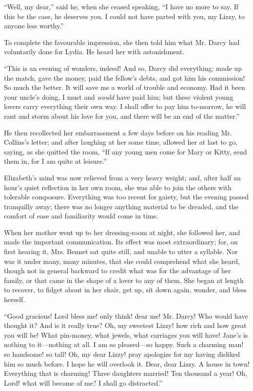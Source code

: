 \documentclass[12pt,openright]{book}
\begin{document}
“Well, my dear,” said he, when she ceased speaking, “I have no more to say. If this be the case, he deserves you. I could not have parted with you, my Lizzy, to anyone less worthy.”

To complete the favourable impression, she then told him what Mr. Darcy had voluntarily done for Lydia. He heard her with astonishment.

“This is an evening of wonders, indeed! And so, Darcy did everything; made up the match, gave the money, paid the fellow’s debts, and got him his commission! So much the better. It will save me a world of trouble and economy. Had it been your uncle’s doing, I must and \textit{would} have paid him; but these violent young lovers carry everything their own way. I shall offer to pay him to-morrow, he will rant and storm about his love for you, and there will be an end of the matter.”

He then recollected her embarrassment a few days before on his reading Mr. Collins’s letter; and after laughing at her some time, allowed her at last to go, saying, as she quitted the room, “If any young men come for Mary or Kitty, send them in, for I am quite at leisure.”

Elizabeth’s mind was now relieved from a very heavy weight; and, after half an hour’s quiet reflection in her own room, she was able to join the others with tolerable composure. Everything was too recent for gaiety, but the evening passed tranquilly away; there was no longer anything material to be dreaded, and the comfort of ease and familiarity would come in time.

When her mother went up to her dressing-room at night, she followed her, and made the important communication. Its effect was most extraordinary; for, on first hearing it, Mrs. Bennet sat quite still, and unable to utter a syllable. Nor was it under many, many minutes, that she could comprehend what she heard, though not in general backward to credit what was for the advantage of her family, or that came in the shape of a lover to any of them. She began at length to recover, to fidget about in her chair, get up, sit down again, wonder, and bless herself.

“Good gracious! Lord bless me! only think! dear me! Mr. Darcy! Who would have thought it? And is it really true? Oh, my sweetest Lizzy! how rich and how great you will be! What pin-money, what jewels, what carriages you will have! Jane’s is nothing to it—nothing at all. I am so pleased—so happy. Such a charming man! so handsome! so tall! Oh, my dear Lizzy! pray apologize for my having disliked him so much before. I hope he will overlook it. Dear, dear Lizzy. A house in town! Everything that is charming! Three daughters married! Ten thousand a year! Oh, Lord! what will become of me? I shall go distracted.”
\end{document}
